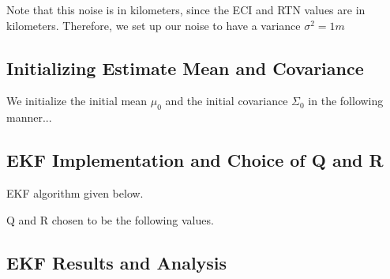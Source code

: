 Note that this noise is in kilometers, since the ECI and RTN values are in kilometers. Therefore, we set up our noise to have a variance $\sigma^2 = 1 m$

\subsection{Initializing Estimate Mean and Covariance}

We initialize the initial mean $\mu_0$ and the initial covariance $\Sigma_0$ in the following manner...

\subsection{EKF Implementation and Choice of Q and R}

EKF algorithm given below.

Q and R chosen to be the following values.

\subsection{EKF Results and Analysis}

